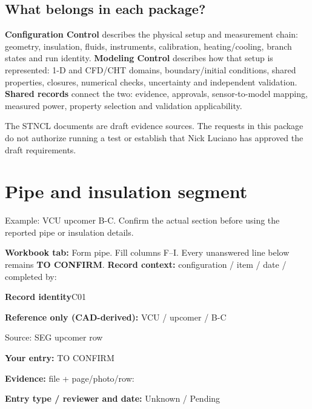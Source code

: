 \documentclass[11pt]{article}
\newcommand{\notebox}[1]{\par\noindent\colorbox{amber}{\parbox{\dimexpr\linewidth-2\fboxsep\relax}{#1}}\par}
\begin{document}
\subsection*{What belongs in each package?}
\textbf{Configuration Control} describes the physical setup and measurement chain: geometry, insulation, fluids, instruments, calibration, heating/cooling, branch states and run identity.
\textbf{Modeling Control} describes how that setup is represented: 1-D and CFD/CHT domains, boundary/initial conditions, shared properties, closures, numerical checks, uncertainty and independent validation.
\textbf{Shared records} connect the two: evidence, approvals, sensor-to-model mapping, measured power, property selection and validation applicability.
\notebox{The STNCL documents are draft evidence sources. The requests in this package do not authorize running a test or establish that Nick Luciano has approved the draft requirements.}
\clearpage\tableofcontents
\clearpage\section{Pipe and insulation segment}\label{form-pipe}
Example: VCU upcomer B-C. Confirm the actual section before using the reported pipe or insulation details.
\par\textbf{Workbook tab:} Form pipe. Fill columns F--I. Every unanswered line below remains \textbf{TO CONFIRM}.
\textbf{Record context:} configuration / item / date / completed by: \hrulefill\par
\begin{minipage}{\textwidth}\small
{\color{navy}\bfseries Record identity}\hfill C01\par
\colorbox{pale}{\parbox{\dimexpr\linewidth-2\fboxsep\relax}{
\textbf{Reference only (CAD-derived):} VCU / upcomer / B-C\par
{\footnotesize Source: SEG upcomer row}}}\par
\textbf{Your entry:} {\color{muted}TO CONFIRM}\enspace\hrulefill\par
{\footnotesize\textbf{Evidence:} file + page/photo/row: \hrulefill\par
\textbf{Entry type / reviewer and date:} Unknown / Pending\par
}\end{minipage}\par\vspace{5pt}
\end{document}
